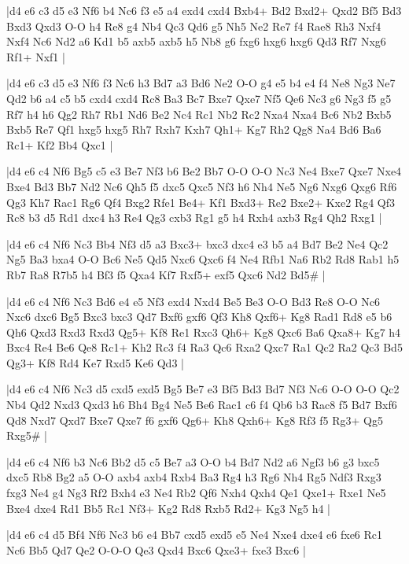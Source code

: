\whitename{}
\blackname{}
\makegametitle
|d4 e6 c3 d5 e3 Nf6 b4 Nc6 f3 e5 a4 exd4 cxd4 Bxb4+ Bd2 Bxd2+ Qxd2 Bf5 Bd3 Bxd3 Qxd3 O-O h4 Re8 g4 Nb4 Qc3 Qd6 g5 Nh5 Ne2 Re7 f4 Rae8 Rh3 Nxf4 Nxf4 Nc6 Nd2 a6 Kd1 b5 axb5 axb5 h5 Nb8 g6 fxg6 hxg6 hxg6 Qd3 Rf7 Nxg6 Rf1+ Nxf1  |

\whitename{}
\blackname{}
\makegametitle
|d4 e6 c3 d5 e3 Nf6 f3 Nc6 h3 Bd7 a3 Bd6 Ne2 O-O g4 e5 b4 e4 f4 Ne8 Ng3 Ne7 Qd2 b6 a4 c5 b5 cxd4 cxd4 Rc8 Ba3 Bc7 Bxe7 Qxe7 Nf5 Qe6 Nc3 g6 Ng3 f5 g5 Rf7 h4 h6 Qg2 Rh7 Rb1 Nd6 Be2 Nc4 Rc1 Nb2 Rc2 Nxa4 Nxa4 Bc6 Nb2 Bxb5 Bxb5 Re7 Qf1 hxg5 hxg5 Rh7 Rxh7 Kxh7 Qh1+ Kg7 Rh2 Qg8 Na4 Bd6 Ba6 Rc1+ Kf2 Bb4 Qxc1  |

\whitename{}
\blackname{}
\makegametitle
|d4 e6 c4 Nf6 Bg5 c5 e3 Be7 Nf3 b6 Be2 Bb7 O-O O-O Nc3 Ne4 Bxe7 Qxe7 Nxe4 Bxe4 Bd3 Bb7 Nd2 Nc6 Qh5 f5 dxc5 Qxc5 Nf3 h6 Nh4 Ne5 Ng6 Nxg6 Qxg6 Rf6 Qg3 Kh7 Rac1 Rg6 Qf4 Bxg2 Rfe1 Be4+ Kf1 Bxd3+ Re2 Bxe2+ Kxe2 Rg4 Qf3 Rc8 b3 d5 Rd1 dxc4 h3 Re4 Qg3 cxb3 Rg1 g5 h4 Rxh4 axb3 Rg4 Qh2 Rxg1  |

\whitename{}
\blackname{}
\makegametitle
|d4 e6 c4 Nf6 Nc3 Bb4 Nf3 d5 a3 Bxc3+ bxc3 dxc4 e3 b5 a4 Bd7 Be2 Ne4 Qc2 Ng5 Ba3 bxa4 O-O Bc6 Ne5 Qd5 Nxc6 Qxc6 f4 Ne4 Rfb1 Na6 Rb2 Rd8 Rab1 h5 Rb7 Ra8 R7b5 h4 Bf3 f5 Qxa4 Kf7 Rxf5+ exf5 Qxc6 Nd2 Bd5\#  |

\whitename{}
\blackname{}
\makegametitle
|d4 e6 c4 Nf6 Nc3 Bd6 e4 e5 Nf3 exd4 Nxd4 Be5 Be3 O-O Bd3 Re8 O-O Nc6 Nxc6 dxc6 Bg5 Bxc3 bxc3 Qd7 Bxf6 gxf6 Qf3 Kh8 Qxf6+ Kg8 Rad1 Rd8 e5 b6 Qh6 Qxd3 Rxd3 Rxd3 Qg5+ Kf8 Re1 Rxc3 Qh6+ Kg8 Qxc6 Ba6 Qxa8+ Kg7 h4 Bxc4 Re4 Be6 Qe8 Rc1+ Kh2 Rc3 f4 Ra3 Qc6 Rxa2 Qxc7 Ra1 Qc2 Ra2 Qc3 Bd5 Qg3+ Kf8 Rd4 Ke7 Rxd5 Ke6 Qd3  |

\whitename{}
\blackname{}
\makegametitle
|d4 e6 c4 Nf6 Nc3 d5 cxd5 exd5 Bg5 Be7 e3 Bf5 Bd3 Bd7 Nf3 Nc6 O-O O-O Qc2 Nb4 Qd2 Nxd3 Qxd3 h6 Bh4 Bg4 Ne5 Be6 Rac1 c6 f4 Qb6 b3 Rac8 f5 Bd7 Bxf6 Qd8 Nxd7 Qxd7 Bxe7 Qxe7 f6 gxf6 Qg6+ Kh8 Qxh6+ Kg8 Rf3 f5 Rg3+ Qg5 Rxg5\#  |

\whitename{}
\blackname{}
\makegametitle
|d4 e6 c4 Nf6 b3 Nc6 Bb2 d5 c5 Be7 a3 O-O b4 Bd7 Nd2 a6 Ngf3 b6 g3 bxc5 dxc5 Rb8 Bg2 a5 O-O axb4 axb4 Rxb4 Ba3 Rg4 h3 Rg6 Nh4 Rg5 Ndf3 Rxg3 fxg3 Ne4 g4 Ng3 Rf2 Bxh4 e3 Ne4 Rb2 Qf6 Nxh4 Qxh4 Qe1 Qxe1+ Rxe1 Ne5 Bxe4 dxe4 Rd1 Bb5 Rc1 Nf3+ Kg2 Rd8 Rxb5 Rd2+ Kg3 Ng5 h4  |

\whitename{}
\blackname{}
\makegametitle
|d4 e6 c4 d5 Bf4 Nf6 Nc3 b6 e4 Bb7 cxd5 exd5 e5 Ne4 Nxe4 dxe4 e6 fxe6 Rc1 Nc6 Bb5 Qd7 Qe2 O-O-O Qe3 Qxd4 Bxc6 Qxe3+ fxe3 Bxc6  |

